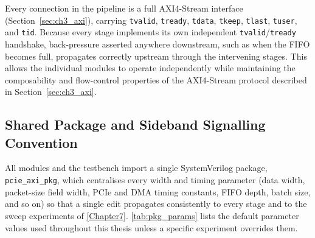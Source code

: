 Every connection in the pipeline is a full AXI4-Stream interface (Section~\ref{sec:ch3_axi}), carrying \texttt{tvalid}, \texttt{tready}, \texttt{tdata}, \texttt{tkeep}, \texttt{tlast}, \texttt{tuser}, and \texttt{tid}. Because every stage implements its own independent \texttt{tvalid}/\texttt{tready} handshake, back-pressure asserted anywhere downstream, such as when the FIFO becomes full, propagates correctly upstream through the intervening stages. This allows the individual modules to operate independently while maintaining the composability and flow-control properties of the AXI4-Stream protocol described in Section~\ref{sec:ch3_axi}.




\subsection{Shared Package and Sideband Signalling Convention}
\label{sec:ch4_sideband}

All modules and the testbench import a single SystemVerilog package, \texttt{pcie\_axi\_pkg}, which centralises every width and timing parameter (data width, packet-size field width, PCIe and DMA timing constants, FIFO depth, batch size, and so on) so that a single edit propagates consistently to every stage and to the sweep experiments of \autoref{Chapter7}. \autoref{tab:pkg_params} lists the default parameter values used throughout this thesis unless a specific experiment overrides them.


